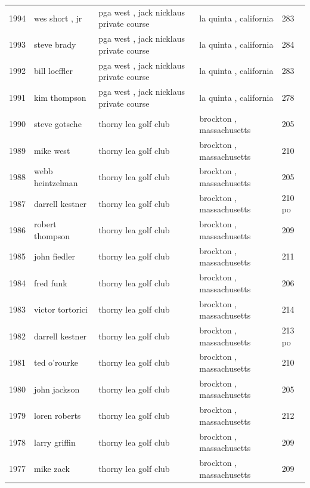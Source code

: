 \documentclass{article}
\begin{document}
\begin{tabular}{lllll}
1994 & wes short , jr & pga west , jack nicklaus private course & la quinta , california & 283 \\
1993 & steve brady & pga west , jack nicklaus private course & la quinta , california & 284 \\
1992 & bill loeffler & pga west , jack nicklaus private course & la quinta , california & 283 \\
1991 & kim thompson & pga west , jack nicklaus private course & la quinta , california & 278 \\
1990 & steve gotsche & thorny lea golf club & brockton , massachusetts & 205 \\
1989 & mike west & thorny lea golf club & brockton , massachusetts & 210 \\
1988 & webb heintzelman & thorny lea golf club & brockton , massachusetts & 205 \\
1987 & darrell kestner & thorny lea golf club & brockton , massachusetts & 210 po \\
1986 & robert thompson & thorny lea golf club & brockton , massachusetts & 209 \\
1985 & john fiedler & thorny lea golf club & brockton , massachusetts & 211 \\
1984 & fred funk & thorny lea golf club & brockton , massachusetts & 206 \\
1983 & victor tortorici & thorny lea golf club & brockton , massachusetts & 214 \\
1982 & darrell kestner & thorny lea golf club & brockton , massachusetts & 213 po \\
1981 & ted o'rourke & thorny lea golf club & brockton , massachusetts & 210 \\
1980 & john jackson & thorny lea golf club & brockton , massachusetts & 205 \\
1979 & loren roberts & thorny lea golf club & brockton , massachusetts & 212 \\
1978 & larry griffin & thorny lea golf club & brockton , massachusetts & 209 \\
1977 & mike zack & thorny lea golf club & brockton , massachusetts & 209 \\
\bottomrule
\end{tabular}
\end{document}
